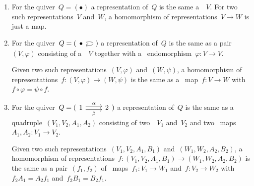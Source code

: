 \begin{example}
  \leavevmode
  \begin{enumerate}
    \item
      For the quiver~$Q = (\bullet)$ a representation of~$Q$ is the same a~{\kmod}~$V$.
      For two such representations~$V$ and~$W$, a homomorphism of representations~$V \to W$ is just a {\klin} map.
    \item
      For the quiver~$Q = (\begin{tikzcd} \bullet \arrow[loop right] \end{tikzcd})$ a representation of~$Q$ is the same as a pair~$(V,\varphi)$ consisting of a~{\kmod}~$V$ together with a~{\klin} endomorphism~$\varphi \colon V \to V$.
      
      Given two such representations~$(V, \varphi)$ and~$(W,\psi)$, a homomorphism of representations~$f \colon (V,\varphi) \to (W,\psi)$ is the same as a~{\klin} map~$f \colon V \to W$ with~$f \circ \varphi = \psi \circ f$.
    \item
      For the quiver~$Q = (\begin{tikzcd} 1 \arrow[shift left]{r}[above]{\alpha} \arrow[shift right]{r}[below]{\beta} & 2 \end{tikzcd})$ a representation of~$Q$ is the same as a quadruple~$(V_1,V_2,A_1,A_2)$ consisting of two~{\kmods}~$V_1$ and~$V_2$ and two~{\klin} maps~$A_1, A_2 \colon V_1 \to V_2$.
      
      Given two such representations~$(V_1, V_2, A_1, B_1)$ and~$(W_1, W_2, A_2, B_2)$, a homomorphism of representations~$f \colon (V_1, V_2, A_1, B_1) \to (W_1, W_2, A_2, B_2)$ is the same as a pair~$(f_1, f_2)$ of~{\klin} maps~$f_1 \colon V_1 \to W_1$ and~$f \colon V_2 \to W_2$ with~$f_2 A_1 = A_2 f_1$ and~$f_2 B_1 = B_2 f_1$.
  \end{enumerate}
\end{example}







